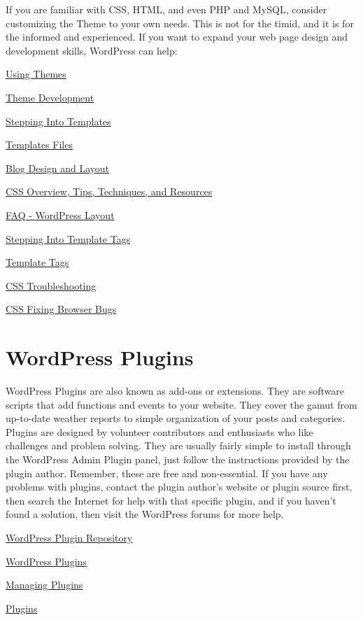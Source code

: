If you are familiar with CSS, HTML, and even PHP and MySQL, consider customizing the Theme to your own needs. This is not for the timid, and it is for the informed and experienced. If you want to expand your web page design and development skills, WordPress can help:
\begin{compactitem}
\item \href{http://codex.wordpress.org/Using_Themes}{Using Themes}
\item \href{http://codex.wordpress.org/Theme_Development}{Theme Development}
\item \href{http://codex.wordpress.org/Stepping_Into_Templates}{Stepping Into Templates}
\item \href{http://codex.wordpress.org/Templates}{Templates Files}
\item \href{http://codex.wordpress.org/Blog_Design_and_Layout}{Blog Design and Layout}
\item \href{http://codex.wordpress.org/CSS}{CSS Overview, Tips, Techniques, and Resources}
\item \href{http://codex.wordpress.org/FAQ#Layout}{FAQ - WordPress Layout}
\item \href{http://codex.wordpress.org/Stepping_Into_Template_Tags}{Stepping Into Template Tags}
\item \href{http://codex.wordpress.org/Template_Tags}{Template Tags}
\item \href{http://codex.wordpress.org/CSS_Troubleshooting}{CSS Troubleshooting}
\item \href{http://codex.wordpress.org/CSS_Fixing_Browser_Bugs}{CSS Fixing Browser Bugs}
\end{compactitem}

\section{WordPress Plugins}

WordPress Plugins are also known as add-ons or extensions. They are software scripts that add functions and events to your website. They cover the gamut from up-to-date weather reports to simple organization of your posts and categories. Plugins are designed by volunteer contributors and enthusiasts who like challenges and problem solving. They are usually fairly simple to install through the WordPress Admin Plugin panel, just follow the instructions provided by the plugin author. Remember, these are free and non-essential. If you have any problems with plugins, contact the plugin author's website or plugin source first, then search the Internet for help with that specific plugin, and if you haven't found a solution, then visit the WordPress forums for more help.
\begin{compactitem}
\item \href{http://www.wp-plugins.org/}{WordPress Plugin Repository}
\item \href{http://www.wp-plugins.net/}{WordPress Plugins}
\item \href{http://codex.wordpress.org/Managing_Plugins}{Managing Plugins}
\item \href{http://codex.wordpress.org/Plugins}{Plugins}
\end{compactitem}

